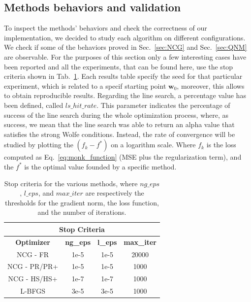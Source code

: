 \documentclass[11pt]{article}
\newcommand{\cac}[1]{{\textcolor{blue}[\textcolor{blue}{\bf{AC: }}{ \textcolor{blue}
              {#1}\textcolor{blue}]}}}
\begin{document}
\subsection{Methods behaviors and validation}\label{sec:exp_behaviors}
To inspect the methods' behaviors and check the correctness of our implementation, we decided to study each algorithm on different configurations. We check if some of the behaviors proved in Sec.~\ref{sec:NCG} and Sec.~\ref{sec:QNM} are observable. For the purposes of this section only a few interesting cases have been reported and all the experiments, that can be found here, use the stop criteria shown in Tab.~\ref{tab:stop_criteria}. Each results table specify the seed for that particular experiment, which is related to a specif starting point $\mathbf{w}_0$, moreover, this allows to obtain reproducible results.  Regarding the line search, a percentage value has been defined, called $ls\_hit\_rate$. This parameter indicates the percentage of success of the line search during the whole optimization process, where, as success, we mean that the line search was able to return an alpha value that satisfies the strong Wolfe conditions.
Instead, the rate of convergence will be studied by plotting the $(f_k - f^*)$ on a logarithm scale. Where $f_k$ is the loss computed as Eq.~\ref{eq:monk_function} (MSE plus the regularization term), and the $f^*$ is the optimal value founded by a specific method.

\begin{table}[H]
\small
    \centering
    \begin{tabular}{|c|c|c|c|}
        \hline
        \multicolumn{4}{|c|}{\textbf{Stop Criteria}} \\
        \hline
        \textbf{Optimizer} &  \textbf{ng\_eps} & \textbf{l\_eps} & \textbf{max\_iter} \\
        \hline
        NCG - FR & 1e-5 & 1e-5 & 20000\\
        \hline
        NCG - PR/PR+ & 1e-5 & 1e-5 & 1000\\
        \hline
        NCG - HS/HS+ & 1e-7 & 1e-7 & 1000\\
        \hline
        L-BFGS & 3e-5 & 3e-5 & 1000\\
        \hline
    \end{tabular}
    \caption{Stop criteria for the various methods, where $ng\_eps$, $l\_eps$, and $max\_iter$ are respectively the thresholds for the gradient norm, the loss function, and the number of iterations. }
    \label{tab:stop_criteria}
\end{table}
\end{document}

